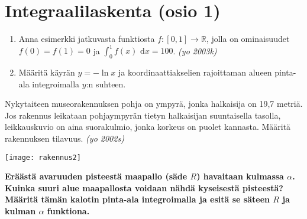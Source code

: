 \documentclass[12pt,finnish]{exam}
\begin{document}
 \section*{Integraalilaskenta (osio 1)}
\vspace{5mm}
 
\begin{questions}
\bfseries
\question
\mdseries
\begin{enumerate}[label=\textbf{\alph*)}]
\item Anna esimerkki jatkuvasta funktiosta \(f:[0, 1]\rightarrow \mathbb{R}\), jolla on ominaisuudet \(f(0)=f(1)=0\) ja \(\displaystyle \int_0^1 {f(x)} \text{ d}x=100\). \emph{(yo 2003k)}\\
\item Määritä käyrän \(y=-\ln x\) ja koordinaattiakselien rajoittaman alueen pinta-ala integroimalla \(y\):n suhteen.
\end{enumerate}

\bfseries
\question
\mdseries 

\vspace{-9ex}

\noindent\begin{minipage}{0.6\textwidth}

\vspace{11.2ex}
Nykytaiteen museorakennuksen pohja on ympyrä, jonka halkaisija on 19,7 metriä. Jos rakennus leikataan pohjaympyrän tietyn halkaisijan suuntaisella tasolla, leikkauskuvio on aina suorakulmio, jonka korkeus on puolet kannasta. Määritä rakennuksen tilavuus. \emph{(yo 2002s)}
\end{minipage}
\hfill%
\begin{minipage}{0.3\textwidth}%

\vspace{10ex}
\texttt{[image: rakennus2]}
\end{minipage}%



\bfseries
\question
\mdseries
Eräästä avaruuden pisteestä maapallo (säde \(R\)) havaitaan kulmassa \(\alpha\). Kuinka suuri alue maapallosta voidaan nähdä kyseisestä pisteestä? Määritä tämän kalotin pinta-ala integroimalla ja esitä se säteen \(R\) ja kulman \(\alpha\) funktiona.
\\  
\\ 
\\ 
\\
\end{questions}
\end{document}
